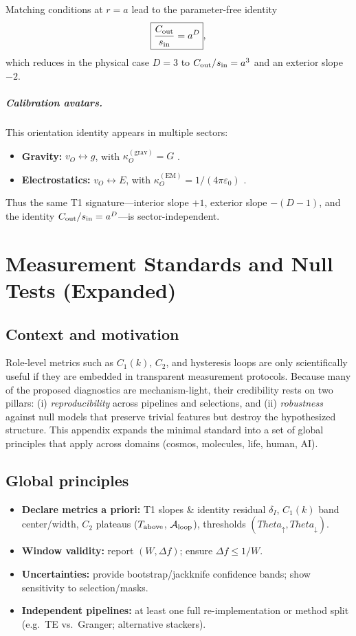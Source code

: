 \documentclass[12pt,a4paper,oneside]{scrreprt}
\def\Theta{Theta}%
\def\;{}%
\begin{document}
\noindent Matching conditions at $r=a$ lead to the parameter-free identity
\[
\boxed{\;\frac{C_{\rm out}}{s_{\rm in}}=a^{D}\;},
\]
which reduces in the physical case $D=3$ to $C_{\rm out}/s_{\rm in}=a^3$ and an exterior slope $-2$.

\paragraph{Calibration avatars.}
This orientation identity appears in multiple sectors:
\begin{itemize}
\item \textbf{Gravity:} $\;v_O\leftrightarrow g$, with $\kappa_O^{(\mathrm{grav})}=G$ \cite{poisson2014gravity}.
\item \textbf{Electrostatics:} $\;v_O\leftrightarrow E$, with $\kappa_O^{(\mathrm{EM})}=1/(4\pi\varepsilon_0)$ \cite{jackson1999classical}.
\end{itemize}
Thus the same T1 signature—interior slope $+1$, exterior slope $-(D-1)$, and the identity $C_{\rm out}/s_{\rm in}=a^D$—is sector-independent.


\chapter{Measurement Standards and Null Tests (Expanded)}\label{app:standards}

\section*{Context and motivation}
Role-level metrics such as $C_1(k)$, $C_2$, and hysteresis loops are only
scientifically useful if they are embedded in transparent measurement protocols.
Because many of the proposed diagnostics are mechanism-light, their credibility
rests on two pillars: (i) \emph{reproducibility} across pipelines and selections,
and (ii) \emph{robustness} against null models that preserve trivial features but
destroy the hypothesized structure. This appendix expands the minimal standard
into a set of global principles that apply across domains (cosmos, molecules,
life, human, AI). 

\section*{Global principles}
\begin{itemize}
\item \textbf{Declare metrics a priori:} T1 slopes \& identity residual $\delta_I$, 
      $C_1(k)$ band center/width, $C_2$ plateaus ($T_{\rm above}$, $\mathcal A_{\rm loop}$),
      thresholds $(\Theta_\uparrow,\Theta_\downarrow)$.
\item \textbf{Window validity:} report $(W,\Delta f)$; ensure $\Delta f\le 1/W$.
\item \textbf{Uncertainties:} provide bootstrap/jackknife confidence bands;
      show sensitivity to selection/masks.
\item \textbf{Independent pipelines:} at least one full re-implementation or
      method split (e.g.\ TE vs.\ Granger; alternative stackers).
\end{itemize}
\end{document}
